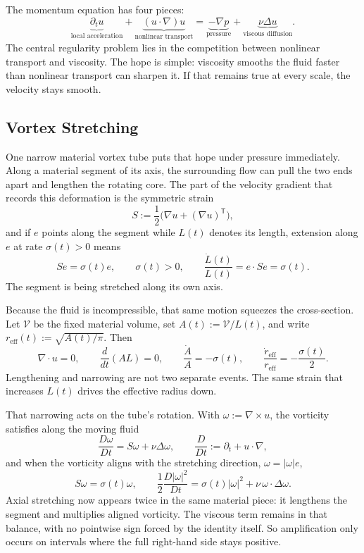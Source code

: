 
The momentum equation has four pieces:
\[
  \underbrace{\partial_t u}_{\text{local acceleration}}
  +
  \underbrace{(u\cdot\nabla)u}_{\text{nonlinear transport}}
  =
  \underbrace{-\nabla p}_{\text{pressure}}
  +
  \underbrace{\nu\Delta u}_{\text{viscous diffusion}}.
\]
The central regularity problem lies in the competition between nonlinear transport and viscosity.
The hope is simple: viscosity smooths the fluid faster than nonlinear transport can sharpen it.
If that remains true at every scale, the velocity stays smooth.

\subsection{Vortex Stretching}\label{sub:ThePerfectlyStretchingVortex}

One narrow material vortex tube puts that hope under pressure immediately.
Along a material segment of its axis, the surrounding flow can pull the two ends apart and lengthen the rotating core.
The part of the velocity gradient that records this deformation is the symmetric strain
\[
  S:=\frac12\bigl(\nabla u+(\nabla u)^{\mathsf T}\bigr),
\]
and if \(e\) points along the segment while \(L(t)\) denotes its length, extension along \(e\) at rate \(\sigma(t)>0\) means
\[
  Se=\sigma(t)e,
  \qquad
  \sigma(t)>0,
  \qquad
  \frac{\dot L(t)}{L(t)}
  =
  e\cdot Se
  =
  \sigma(t).
\]
The segment is being stretched along its own axis.

Because the fluid is incompressible, that same motion squeezes the cross-section.
Let \(\mathcal V\) be the fixed material volume, set \(A(t):=\mathcal V/L(t)\), and write \(r_{\mathrm{eff}}(t):=\sqrt{A(t)/\pi}\).
Then
\[
  \nabla\cdot u=0,
  \qquad
  \frac{d}{dt}(A L)=0,
  \qquad
  \frac{\dot A}{A}=-\sigma(t),
  \qquad
  \frac{\dot r_{\mathrm{eff}}}{r_{\mathrm{eff}}}
  =
  -\frac{\sigma(t)}{2}.
\]
Lengthening and narrowing are not two separate events.
The same strain that increases \(L(t)\) drives the effective radius down.

That narrowing acts on the tube's rotation.
With \(\omega:=\nabla\times u\), the vorticity satisfies along the moving fluid
\[
  \frac{D\omega}{Dt}
  =
  S\omega+\nu\Delta\omega,
  \qquad
  \frac{D}{Dt}
  :=
  \partial_t+u\cdot\nabla,
\]
and when the vorticity aligns with the stretching direction, \(\omega=|\omega|e\),
\[
  S\omega
  =
  \sigma(t)\omega,
  \qquad
  \frac12\frac{D|\omega|^2}{Dt}
  =
  \sigma(t)|\omega|^2
  +
  \nu\,\omega\cdot\Delta\omega.
\]
Axial stretching now appears twice in the same material piece: it lengthens the segment and multiplies aligned vorticity.
The viscous term remains in that balance, with no pointwise sign forced by the identity itself.
So amplification only occurs on intervals where the full right-hand side stays positive.

